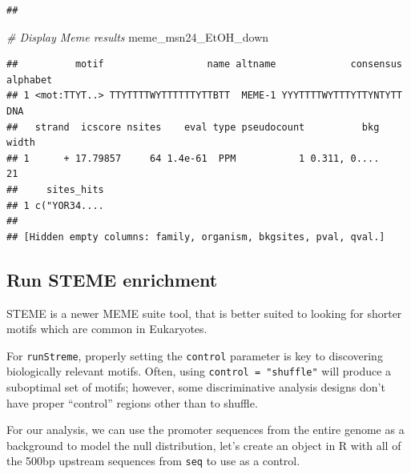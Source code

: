 \documentclass[
]{book}
\newenvironment{Shaded}{\begin{snugshade}}{\end{snugshade}}
\newcommand{\CommentTok}[1]{\textcolor[rgb]{0.56,0.35,0.01}{\textit{#1}}}
\newcommand{\NormalTok}[1]{#1}
\begin{document}
\begin{verbatim}
## 
\end{verbatim}

\begin{Shaded}
\begin{Highlighting}[]
\CommentTok{\# Display Meme results}
\NormalTok{meme\_msn24\_EtOH\_down}
\end{Highlighting}
\end{Shaded}

\begin{verbatim}
##          motif                  name altname             consensus alphabet
## 1 <mot:TTYT..> TTYTTTTWYTTTTTTYTTBTT  MEME-1 YYYTTTTWYTTTYTTYNTYTT      DNA
##   strand  icscore nsites    eval type pseudocount          bkg width
## 1      + 17.79857     64 1.4e-61  PPM           1 0.311, 0....    21
##     sites_hits
## 1 c("YOR34....
## 
## [Hidden empty columns: family, organism, bkgsites, pval, qval.]
\end{verbatim}

\hypertarget{run-steme-enrichment}{%
\subsection{Run STEME enrichment}\label{run-steme-enrichment}}

STEME is a newer MEME suite tool, that is better suited to looking for
shorter motifs which are common in Eukaryotes.

For \texttt{runStreme}, properly setting the \texttt{control} parameter is key to
discovering biologically relevant motifs. Often, using
\texttt{control\ =\ "shuffle"} will produce a suboptimal set of motifs; however,
some discriminative analysis designs don't have proper ``control'' regions
other than to shuffle.

For our analysis, we can use the promoter sequences from the entire
genome as a background to model the null distribution, let's create an
object in R with all of the 500bp upstream sequences from \texttt{seq} to use
as a control.
\end{document}
